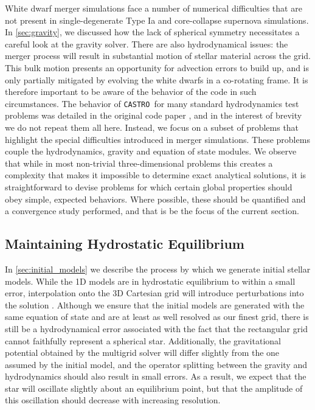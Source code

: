 \documentclass[iop,numberedappendix]{../emulateapj}
\newcommand{\castro}{\texttt{CASTRO}}
\begin{document}
White dwarf merger simulations face a number of numerical difficulties that are
not present in single-degenerate Type Ia and core-collapse supernova
simulations. In \autoref{sec:gravity}, we discussed how the lack
of spherical symmetry necessitates a careful look at the gravity
solver. There are also hydrodynamical issues: the merger process will
result in substantial motion of stellar material across the grid. This
bulk motion presents an opportunity for advection errors to build up,
and is only partially mitigated by evolving the white dwarfs in a
co-rotating frame. It is therefore important to be aware of the
behavior of the code in such circumstances. The behavior of \castro\ for
many standard hydrodynamics test problems was detailed in the original
code paper \citep{castro}, and in the interest of brevity we do not
repeat them all here. Instead, we focus on a subset of problems that
highlight the special difficulties introduced in merger
simulations. These problems couple the hydrodynamics, gravity and
equation of state modules. We observe that while in most non-trivial
three-dimensional problems this creates a complexity that makes it
impossible to determine exact analytical solutions, it is
straightforward to devise problems for which certain global properties
should obey simple, expected behaviors. Where possible, these should
be quantified and a convergence study performed, and that is
be the focus of the current section.

\subsection{Maintaining Hydrostatic Equilibrium}\label{sec:HSE}

In \autoref{sec:initial_models} we describe the process by which
we generate initial stellar models. While the 1D models are in
hydrostatic equilibrium to within a small error, interpolation onto
the 3D Cartesian grid will introduce perturbations into the solution
\citep{zingale:2002}. Although we ensure that the initial models are
generated with the same equation of state and are at least as well resolved as
our finest grid, there is still be a hydrodynamical error associated
with the fact that the rectangular grid cannot faithfully represent a
spherical star. Additionally, the gravitational potential obtained by
the multigrid solver will differ slightly from the one assumed by the
initial model, and the operator splitting between the gravity and
hydrodynamics should also result in small errors. As a result, we
expect that the star will oscillate slightly about an equilibrium
point, but that the amplitude of this oscillation should decrease with
increasing resolution.
\end{document}
